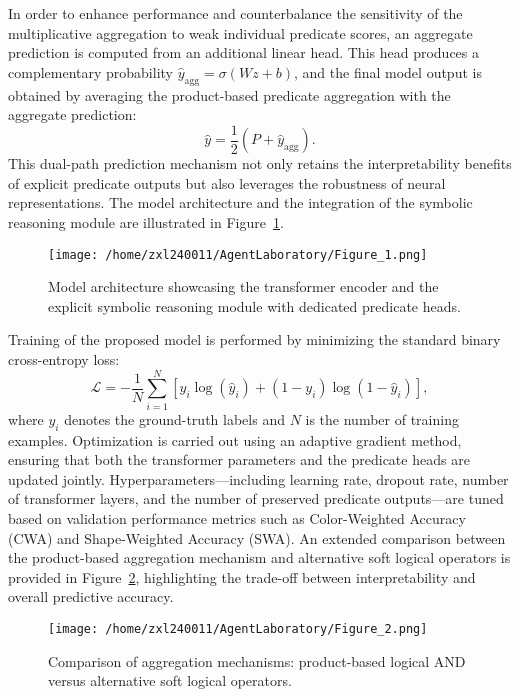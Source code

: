 \documentclass[11pt]{article}
\begin{document}
In order to enhance performance and counterbalance the sensitivity of the multiplicative aggregation to weak individual predicate scores, an aggregate prediction is computed from an additional linear head. This head produces a complementary probability \(\hat{y}_{\text{agg}}=\sigma(W z + b)\), and the final model output is obtained by averaging the product-based predicate aggregation with the aggregate prediction:
\[
\hat{y} = \frac{1}{2}\left(P + \hat{y}_{\text{agg}}\right).
\]
This dual-path prediction mechanism not only retains the interpretability benefits of explicit predicate outputs but also leverages the robustness of neural representations. The model architecture and the integration of the symbolic reasoning module are illustrated in Figure~\ref{fig:fig1}. 

\begin{figure}[h]
\caption{Model architecture showcasing the transformer encoder and the explicit symbolic reasoning module with dedicated predicate heads.}
\centering
\texttt{[image: /home/zxl240011/AgentLaboratory/Figure\_1.png]}
\label{fig:fig1}
\end{figure}

Training of the proposed model is performed by minimizing the standard binary cross-entropy loss:
\[
\mathcal{L} = -\frac{1}{N}\sum_{i=1}^{N}\left[y_i\log(\hat{y}_i) + (1-y_i)\log(1-\hat{y}_i)\right],
\]
where \(y_i\) denotes the ground-truth labels and \(N\) is the number of training examples. Optimization is carried out using an adaptive gradient method, ensuring that both the transformer parameters and the predicate heads are updated jointly. Hyperparameters—including learning rate, dropout rate, number of transformer layers, and the number of preserved predicate outputs—are tuned based on validation performance metrics such as Color-Weighted Accuracy (CWA) and Shape-Weighted Accuracy (SWA). An extended comparison between the product-based aggregation mechanism and alternative soft logical operators is provided in Figure~\ref{fig:fig2}, highlighting the trade-off between interpretability and overall predictive accuracy.

\begin{figure}[h]
\caption{Comparison of aggregation mechanisms: product-based logical AND versus alternative soft logical operators.}
\centering
\texttt{[image: /home/zxl240011/AgentLaboratory/Figure\_2.png]}
\label{fig:fig2}
\end{figure}
\end{document}
